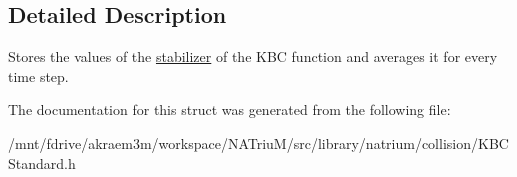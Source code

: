 \subsection{Detailed Description}
Stores the values of the \hyperlink{structnatrium_1_1KBCStandard_1_1stabilizer}{stabilizer} of the KBC function and averages it for every time step. 

The documentation for this struct was generated from the following file:\begin{DoxyCompactItemize}
\item 
/mnt/fdrive/akraem3m/workspace/NATriuM/src/library/natrium/collision/KBCStandard.h\end{DoxyCompactItemize}
